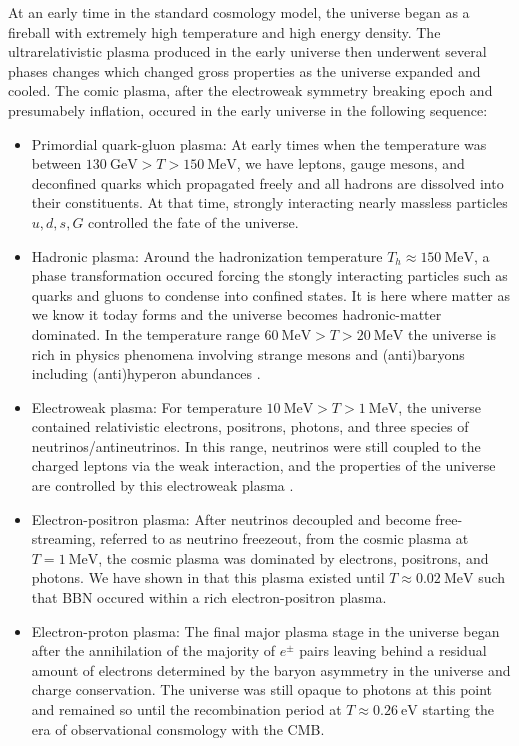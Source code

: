 \documentclass[Universe,article,submit,moreauthors,pdftex]{Definitions/mdpi}
\begin{document}
At an early time in the standard cosmology model, the universe began as a fireball with extremely high temperature and high energy density. The ultrarelativistic plasma produced in the early universe then underwent several phases changes which changed gross properties as the universe expanded and cooled. The comic plasma, after the electroweak symmetry breaking epoch and presumabely inflation, occured in the early universe in the following sequence:
\begin{itemize}
  \item Primordial quark-gluon plasma: At early times when the temperature was between $130\ \mathrm{GeV}>T>150\ \mathrm{MeV}$, we have leptons, gauge mesons, and deconfined quarks which propagated freely and all hadrons are dissolved into their constituents. At that time, strongly interacting nearly massless particles $u,d,s,G$ controlled the fate of the universe.
  \item Hadronic plasma: Around the hadronization temperature $T_h\approx150\ \mathrm{MeV}$, a phase transformation occured forcing the stongly interacting particles such as quarks and gluons to condense into confined states. It is here where matter as we know it today forms and the universe becomes hadronic-matter dominated. In the temperature range $ 60\ \mathrm{MeV}>T>20\ \mathrm{MeV}$ the universe is rich in physics phenomena involving strange mesons and (anti)baryons including (anti)hyperon abundances \cite{Fromerth:2012fe,Yang:2021bko}.
  \item  Electroweak plasma: For temperature $10\ \mathrm{MeV}>T>1\ \mathrm{MeV}$, the universe contained relativistic electrons, positrons, photons, and three species of neutrinos/antineutrinos. In this range, neutrinos were still coupled to the charged leptons via the weak interaction, and the properties of the universe are controlled by this electroweak plasma \cite{Birrell:2012gg}.
  \item  Electron-positron plasma: After neutrinos decoupled and become free-streaming, referred to as neutrino freezeout, from the cosmic plasma at $T=1\ \mathrm{MeV}$, the cosmic plasma was dominated by electrons, positrons, and photons. We have shown in \cite{Chris:2023abc} that this plasma existed until $T\approx0.02\ \mathrm{MeV}$ such that BBN occured within a rich electron-positron plasma.
  \item Electron-proton plasma: The final major plasma stage in the universe began after the annihilation of the majority of $e^{\pm}$ pairs leaving behind a residual amount of electrons determined by the baryon asymmetry in the universe and charge conservation. The universe was still opaque to photons at this point and remained so until the recombination period at $T\approx0.26\ \mathrm{eV}$ starting the era of observational consmology with the CMB.
\end{itemize}
\end{document}
